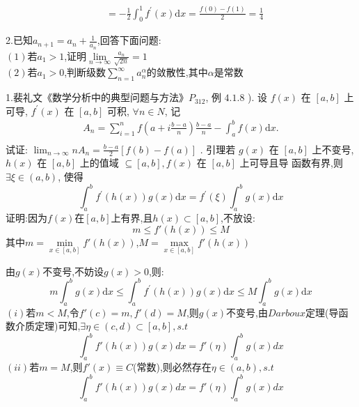 \documentclass{ctexart}
\begin{document}
\begin{tcolorbox}[title = {综合性问题},colbacktitle=red!25!white,colback=white,arc = 2mm, outer arc = 2mm,fonttitle = \itshape, fontupper = \itshape, fontlower = \itshape]
\begin{tcolorbox}[colback=white,arc = 1mm, outer arc = 1mm,fonttitle = \itshape, fontupper = \itshape, fontlower = \itshape]
$$\begin{aligned}
      		&=-\frac{1}{2} \int_{0}^{1} f^{\prime}(x) \mathrm{d} x=\frac{f(0)-f(1)}{2}=\frac{1}{4}
      	\end{aligned}
       $$  
      \end{tcolorbox}
   2.已知$\displaystyle{a_{n+1}=a_{n}+\frac{1}{a_{n}}}$,回答下面问题:\\	
  $(1)$若$a_{1}>1$,证明$\displaystyle{\lim\limits_{n \to \infty}\frac{a_{n}}{\sqrt{2n}}}=1$ \\
  $(2)$若$a_{1}>0$,判断级数$\displaystyle{\sum_{n=1}^{\infty}a_{n}^{\alpha}}$的敛散性,其中$\alpha$是常数
\end{tcolorbox}
  \begin{tcolorbox}[title =补充,colbacktitle=blue!50,colback=white,coltitle=red,arc = 3mm, outer arc = 3mm,fonttitle = \itshape, fontupper = \itshape, fontlower = \itshape]
	1.裴礼文《数学分析中的典型问题与方法》$P_{312}$, 例 $4.1 .8$ ). 设 $f(x)$ 在 $[a, b]$ 上可导, $f^{\prime}(x)$ 在 $[a, b]$ 可积, $\forall n \in N$, 记
	$$
	\begin{array}{r}
		A_{n}=\displaystyle{\sum\limits_{i=1}^{n} f\left(a+i \frac{b-a}{n}\right) \frac{b-a}{n}-\int_{a}^{b} f(x) \mathrm{d} x} . \\
	\end{array}
	$$	
	试证: $\displaystyle{ \lim _{n \rightarrow \infty} n A_{n}=\frac{b-a}{2}[f(b)-f(a)]}$
	. {\color{red}引理}\quad 若 $g(x)$ 在 $[a, b]$ 上不变号, $h(x)$ 在 $[a, b]$ 上的值域 $ \subseteq[a, b], f(x)$ 在 $[a, b]$ 上可导且导 函数有界,则 $\exists \xi \in(a, b)$, 使得
	$$
	\int_{a}^{b} f^{\prime}(h(x)) g(x) \mathrm{d} x=f^{\prime}(\xi) \int_{a}^{b} g(x) \mathrm{d} x
	$$
	证明:因为$f(x)$在$[a,b]$上有界,且$h(x) \subset [a,b]$,不放设:
	$$m \le f'\left( h(x)\right) \le M$$其中$m =\min\limits_{x \in [a,b]}f'(h(x))$,$M =\max\limits_{x \in [a,b]}f'(h(x))$
	
	由$g(x)$不变号,不妨设$g(x) > 0 $,则:
	$$
	m \int_{a}^{b} g(x) \mathrm{d} x \le \int_{a}^{b} f^{\prime}(h(x)) g(x) \mathrm{d} x \le M \int_{a}^{b} g(x) \mathrm{d} x
	$$
	$(i)$若$m < M$,令$f'(c)=m,f'(d)=M$,则$g(x)$不变号,由$Darboux$定理(导函数介质定理)可知,$\exists \eta \in \left( c,d\right)  \subset [a,b],s.t$
	$$\int_{a}^{b}f'(h(x))g(x)dx = f'(\eta) \int_{a}^{b}g(x)dx$$
	$(ii)$若$m=M$,则$f'(x) \equiv C$(常数),则必然存在$\eta \in \left(a,b \right),s.t$
	$$\int_{a}^{b}f'(h(x))g(x)dx = f'(\eta) \int_{a}^{b}g(x)dx$$
	
\end{tcolorbox}
\end{document}
